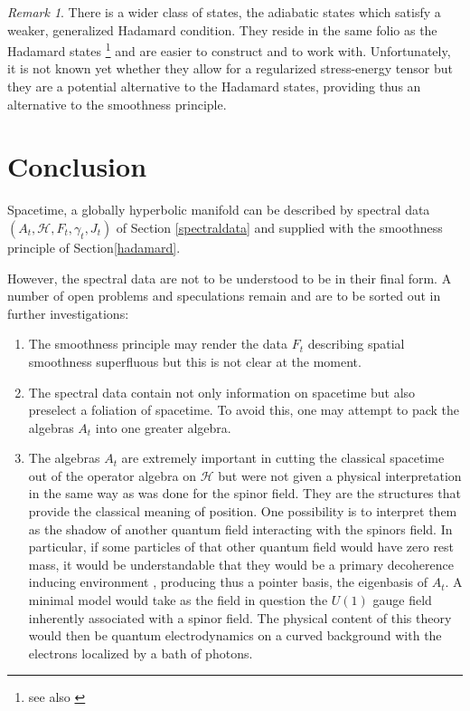 \documentclass[a4paper,10pt,oneside]{amsart}
\theoremstyle{plain}
\theoremstyle{definition}
\theoremstyle{remark}
\newtheorem{remark}{Remark}
\begin{document}
\begin{remark}
  There is a wider class of states, the adiabatic states
  \cite{Parker1969,Deutsch-Najmi,Lueders-Roberts1990,Junker,
  Wellmann,Hollands1999a,Hollands1999b}
  which
  satisfy a weaker, generalized Hadamard condition. They reside  in
  the same folio as the Hadamard states \cite{Junkerprivate}
  \footnote{ see also \cite{Junker-Schrohe}} and
  are easier to construct and to work with. Unfortunately, it is
  not known yet whether they allow for a regularized stress-energy
  tensor but they are a potential alternative to the Hadamard states,
  providing thus an alternative to the smoothness principle.
\end{remark}



\section{Conclusion}



Spacetime, a globally hyperbolic manifold  can be described by
spectral data $({A}_{t},\mathcal{H},{F}_{t},{\gamma}_{t},{J}_{t})$
of Section \ref{spectraldata} and supplied with the smoothness
principle of Section\ref{hadamard}.



However, the spectral data are not to be understood to be in their
final form. A number of open problems and speculations remain and are
to be sorted out in further investigations:



\begin{enumerate}
\item{The smoothness principle may render the data ${F}_{t}$ describing
spatial smoothness superfluous but this is not clear at the
moment. }
\item{The spectral data contain not only information on spacetime
but also preselect a foliation of spacetime. To avoid this, one
may attempt to pack the algebras ${A}_{t}$ into one greater
algebra.}
\item{The algebras ${A}_{t}$ are extremely important in cutting the
classical spacetime out
of the operator algebra on $\mathcal{H}$
but were not given a physical interpretation in the same way as
was done for the spinor field. They are the structures that
provide the classical meaning of position. One possibility is to
interpret them as the shadow of another quantum field interacting
with the spinors field. In particular, if some particles of that
other quantum field would have zero rest mass, it would be
understandable that they would be a primary decoherence inducing
environment \cite{Joos-Zeh,Zurek}, producing thus a pointer basis,
the eigenbasis of ${A}_{t}$. A minimal model would take as the
field in question the $U(1)$ gauge field inherently associated
with a spinor field. The physical content of this theory would then
be quantum electrodynamics on a curved background with the electrons
localized by a bath of photons.}
\end{enumerate}
\end{document}
